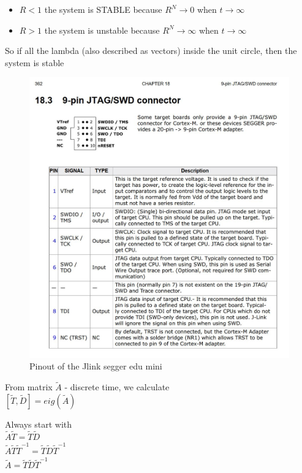 \documentclass{article}
\begin{document}
\begin{itemize}
  \item $ R < 1 $ the system is STABLE because $R^N \rightarrow 0$ when $t \rightarrow \infty$
  \item $ R > 1 $ the system is unstable because $R^N \rightarrow \infty$ when $t \rightarrow \infty$
\end{itemize}
So if all the lambda (also described as vectors) inside the unit circle, then the system is stable
\begin{figure}[h]
  \includegraphics[scale=0.3]{jlink_segger_edu_9pin_JWD-SWD_connector}
  \caption{Pinout of the Jlink segger edu mini}  
\end{figure}

From matrix $\tilde{A}$ - discrete time, we calculate
\\$[ \tilde{T} , \tilde{D}] = eig(\tilde{A})$

Always start with 
\\$ \tilde{A}\tilde{T} = \tilde{T}\tilde{D} $
\\$ \tilde{A}\tilde{T}{\tilde{T}}^{-1} = \tilde{T}\tilde{D}{\tilde{T}}^{-1} $
\\$ \tilde{A} = \tilde{T}\tilde{D}{\tilde{T}}^{-1} $
\end{document}
